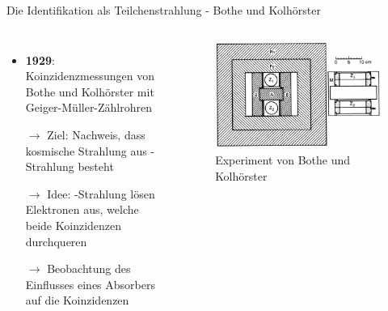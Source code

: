 \documentclass[aspectratio=1610, professionalfonts, 9pt, hyperref={colorlinks=false}]{beamer}
\begin{document}
\begin{frame}{Die Identifikation als Teilchenstrahlung - Bothe und Kolhörster}
  \begin{columns}
      \begin{itemize}
        \setlength\itemsep{0.5em}
        \item \textbf{1929}: Koinzidenzmessungen von Bothe und Kolhörster mit Geiger-Müller-Zählrohren
        \item [$\rightarrow$] Ziel: Nachweis, dass kosmische Strahlung aus \gamma-Strahlung besteht
        \item [$\rightarrow$] Idee: \gamma-Strahlung lösen Elektronen aus, welche beide Koinzidenzen durchqueren
        \item [$\rightarrow$] Beobachtung des Einflusses eines Absorbers auf die Koinzidenzen
      \end{itemize}
        \vspace*{10px}
  
      \begin{figure}
          \centering
          \includegraphics[width=\linewidth]{images/The-experiment-of-Bothe-and-Kolhoerster-in-Ref-48-Coincidences-between-counters-Z-1.png}
          \caption{Experiment von Bothe und Kolhörster \cite{ko}}
      \end{figure}
  \end{columns}
\end{frame}
\end{document}

